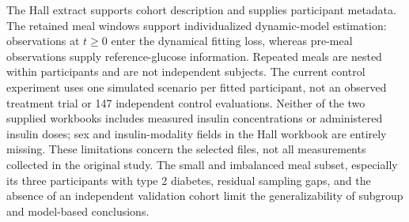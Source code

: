 The Hall extract supports cohort description and supplies participant
metadata. The retained meal windows support individualized dynamic-model
estimation: observations at $t\geq0$ enter the dynamical fitting loss,
whereas pre-meal observations supply reference-glucose information.
Repeated meals are nested within participants and are not independent
subjects. The current control experiment uses one simulated scenario per
fitted participant, not an observed treatment trial or 147 independent
control evaluations. Neither of the two supplied workbooks includes
measured insulin concentrations or administered insulin doses; sex and
insulin-modality fields in the Hall workbook are entirely missing.
These limitations concern the selected files, not all measurements
collected in the original study. The small and imbalanced meal subset,
especially its three participants with type 2 diabetes, residual sampling
gaps, and the absence of an independent validation cohort limit the
generalizability of subgroup and model-based conclusions.
